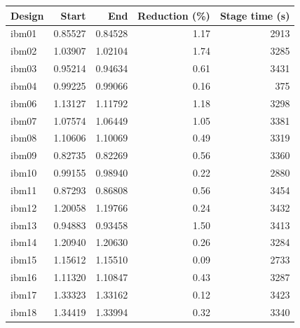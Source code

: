 \begin{tabular}{lrrrr}
\toprule
Design & Start & End & Reduction (\%) & Stage time (s) \\
\midrule
ibm01 & 0.85527 & 0.84528 & 1.17 & 2913 \\
ibm02 & 1.03907 & 1.02104 & 1.74 & 3285 \\
ibm03 & 0.95214 & 0.94634 & 0.61 & 3431 \\
ibm04 & 0.99225 & 0.99066 & 0.16 & 375 \\
ibm06 & 1.13127 & 1.11792 & 1.18 & 3298 \\
ibm07 & 1.07574 & 1.06449 & 1.05 & 3381 \\
ibm08 & 1.10606 & 1.10069 & 0.49 & 3319 \\
ibm09 & 0.82735 & 0.82269 & 0.56 & 3360 \\
ibm10 & 0.99155 & 0.98940 & 0.22 & 2880 \\
ibm11 & 0.87293 & 0.86808 & 0.56 & 3454 \\
ibm12 & 1.20058 & 1.19766 & 0.24 & 3432 \\
ibm13 & 0.94883 & 0.93458 & 1.50 & 3413 \\
ibm14 & 1.20940 & 1.20630 & 0.26 & 3284 \\
ibm15 & 1.15612 & 1.15510 & 0.09 & 2733 \\
ibm16 & 1.11320 & 1.10847 & 0.43 & 3287 \\
ibm17 & 1.33323 & 1.33162 & 0.12 & 3423 \\
ibm18 & 1.34419 & 1.33994 & 0.32 & 3340 \\
\bottomrule
\end{tabular}
